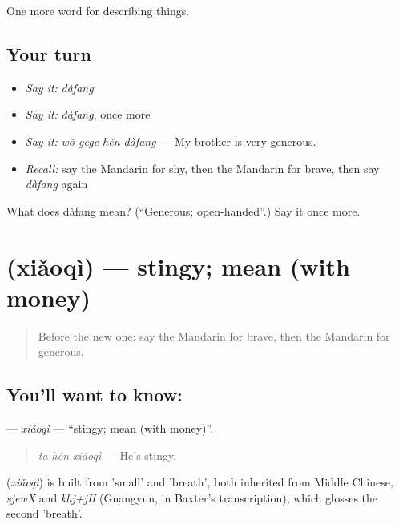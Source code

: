 \begin{grammarlens}[title={What you've built}]
One more word for describing things.
\end{grammarlens}

\subsection*{Your turn}
\begin{itemize}
\raggedright
  \item \emph{Say it:} \emph{dàfang}
  \item \emph{Say it:} \emph{dàfang}, once more
  \item \emph{Say it:} \emph{wǒ gēge hěn dàfang} — My brother is very generous.
  \item \emph{Recall:} say the Mandarin for shy, then the Mandarin for brave, then say \emph{dàfang} again
\end{itemize}

\begin{tcolorbox}[breakable,colback=teal!4,colframe=teal!35!black,title={Before you move on}]
What does dàfang mean? (\textquotedblleft{}Generous; open-handed\textquotedblright{}.) Say it once more.
\end{tcolorbox}
\section[\texorpdfstring{\zh{小气} (xiǎoqì)}{小气 (xiǎoqì)}]{ (xiǎoqì) — stingy; mean (with money)}

\label{lesson:ZH-C265-xiaoqi}



\begin{quote}
Before the new one: say the Mandarin for brave, then the Mandarin for generous.
\end{quote}

\subsection*{You'll want to know: }
\textbf{} — \emph{xiǎoqì} — \textquotedblleft{}stingy; mean (with money)\textquotedblright{}.

\begin{quote}
\textbf{} \emph{tā hěn xiǎoqì} — He's stingy.
\end{quote}

\begin{cousinweb}
\textbf{} (\emph{xiǎoqì}) is built from  'small' and  'breath', both inherited from Middle Chinese, \emph{sjewX} and \emph{khj+jH} (Guangyun, in Baxter's transcription), which glosses the second 'breath'.
\end{cousinweb}

